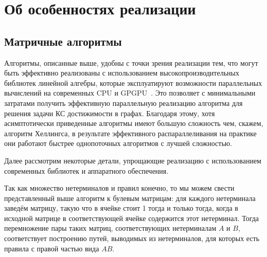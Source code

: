 \section{Об особенностях реализации}
\label{sec:Conclusion_ImplFeatures}

\subsection{Матричные алгоритмы}

Алгоритмы, описанные выше, удобны с точки зрения реализации тем, что могут быть эффективно реализованы с использованием высокопроизводительных библиотек линейной алгебры, которые эксплуатируют возможности параллельных вычислений на современных CPU и  GPGPU~\cite{Mishin:2019:ECP:3327964.3328503}.
Это позволяет с минимальными затратами получить эффективную параллельную реализацию алгоритма для решения задачи КС достижимости в графах.
Благодаря этому, хотя асимптотически приведенные алгоритмы имеют большую сложность чем, скажем, алгоритм Хеллингса, в результате эффективного распараллеливания на практике они работают быстрее однопоточных алгоритмов с лучшей сложностью.

Далее рассмотрим некоторые детали, упрощающие реализацию с использованием современных библиотек и аппаратного обеспечения.

Так как множество нетерминалов и правил конечно, то мы можем свести представленный выше алгоритм к булевым матрицам: для каждого нетерминала заведём матрицу, такую что в ячейке стоит 1 тогда и только тогда, когда в исходной матрице в соответствующей ячейке содержится этот нетерминал.
Тогда перемножение пары таких матриц, соответствующих нетерминалам $A$ и $B$, соответствует построению путей, выводимых из нетерминалов, для которых есть правила с правой частью вида $A B$.

